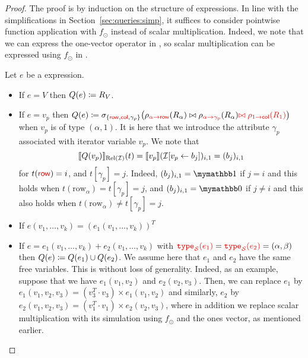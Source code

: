 \begin{proof}
The proof is by induction on the structure of \langsum expressions. In line with the simplifications in Section~\ref{sec:queries:simp}, it suffices to consider pointwise function application with $f_\odot$ instead of scalar multiplication. Indeed, we note that we can express the one-vector operator in \langsum, so scalar multiplication can be expressed using $f_\odot$ in \langsum.

Let $e$ be a \langsum expression.
\begin{itemize}
  \item If $e=V$ then $Q (e)\coloneqq R_V$.
  \item If $e=v_p$ then $Q (e)\coloneqq \sigma_{\lbrace {\color{red} \mathsf{row}},{\color{red} \mathsf{col}},\gamma_p\rbrace}\bigl(\rho_{{\color{red} \alpha\to \mathsf{row}}}(R_\alpha)\bowtie \rho_{{\color{red} \alpha\to\gamma_p}}(R_\alpha){\color{red} \bowtie \rho_{1\to\mathsf{col}}(R_1)}\bigr)$ when  $v_p$ is of type $(\alpha,1)$. It is here that we introduce the attribute $\gamma_p$ associated with iterator variable $v_p$.
 We note that 
$$ \llbracket Q(v_p) \rrbracket_{\text{Rel}(\mathcal{I})}(t)=\llbracket v_p \rrbracket(\mathcal{I}[v_p\gets b_{j}])_{i,1}=(b_j)_{i,1}
$$
for $t({\color{red} \mathsf{row}})=i$,  and $t[\gamma_p]=j$. Indeed, $(b_j)_{i,1}=\kone$ if $j=i$
and this holds when $t(\mathrm{row}_\alpha)=t[\gamma_p]=j$, and $(b_j)_{i,1}=\kzero$ if $j\neq i$
and this also holds when $t(\mathrm{row}_\alpha)\neq t[\gamma_p]=j$.

  \item If $e(v_1,\ldots,v_k)=(e_1(v_1,\ldots,v_k))^T$ %
\item If $e=e_1(v_1,\ldots,v_k)+e_2(v_1,\ldots,v_k)$ with ${\color{red} \texttt{type}_{\mathcal{S}}(e_1)}={\color{red} \texttt{type}_{\mathcal{S}}(e_2)}=(\alpha, \beta)$ then $Q (e)\coloneqq Q (e_1)\cup Q (e_2)$. We assume here that $e_1$ and $e_2$ have the same free variables. This is without loss of generality. Indeed, as an example, suppose that we have $e_1(v_1,v_2)$
and $e_2(v_2,v_3)$. Then, we can replace $e_1$ by  $e_1(v_1,v_2,v_3)=(v_3^T\cdot v_3)\times e_1(v_1,v_2)$
and similarly, $e_2$ by $e_2(v_1,v_2,v_3)=(v_1^T\cdot v_1)\times e_2(v_2,v_3)$, where in addition we replace scalar multiplication with its simulation using $f_{\odot}$ and the ones vector, as mentioned earlier. 


\end{itemize}
\end{proof}
